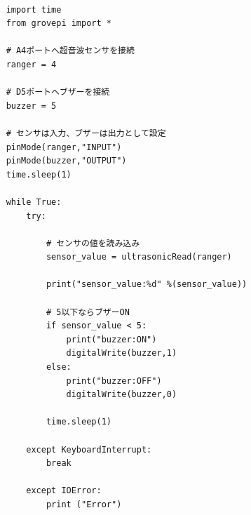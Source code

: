 \documentclass[dvipdfmx,autodetect-engine,titlepage]{jsarticle}
\begin{document}

  \begin{lstlisting}[caption=5-3.py,label=python]

    import time
    from grovepi import *
    
    # A4ポートへ超音波センサを接続
    ranger = 4
    
    # D5ポートへブザーを接続
    buzzer = 5
    
    # センサは入力、ブザーは出力として設定
    pinMode(ranger,"INPUT")
    pinMode(buzzer,"OUTPUT") 
    time.sleep(1)
    
    while True:
        try:
            
            # センサの値を読み込み
            sensor_value = ultrasonicRead(ranger)
            
            print("sensor_value:%d" %(sensor_value))
            
            # 5以下ならブザーON
            if sensor_value < 5:
                print("buzzer:ON")
                digitalWrite(buzzer,1)
            else:
                print("buzzer:OFF")
                digitalWrite(buzzer,0)
            
            time.sleep(1)
                
        except KeyboardInterrupt:
            break
            
        except IOError:
            print ("Error")


  \end{lstlisting}
\end{document}
